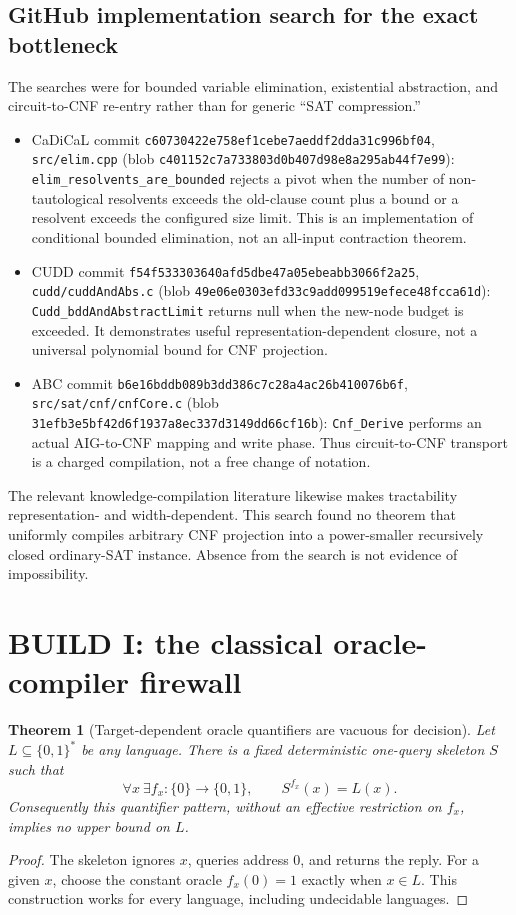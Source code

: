 \documentclass[11pt]{article}
\newtheorem{theorem}{Theorem}
\begin{document}
\subsection{GitHub implementation search for the exact bottleneck}
The searches were for bounded variable elimination, existential abstraction,
and circuit-to-CNF re-entry rather than for generic ``SAT compression.''
\begin{itemize}
\item CaDiCaL commit
\texttt{c60730422e758ef1cebe7aeddf2dda31c996bf04},
\texttt{src/elim.cpp} (blob
\texttt{c401152c7a733803d0b407d98e8a295ab44f7e99}):
\texttt{elim\_resolvents\_are\_bounded} rejects a pivot when the number of
non-tautological resolvents exceeds the old-clause count plus a bound or a
resolvent exceeds the configured size limit.  This is an implementation of
conditional bounded elimination, not an all-input contraction theorem.
\item CUDD commit
\texttt{f54f533303640afd5dbe47a05ebeabb3066f2a25},
\texttt{cudd/cuddAndAbs.c} (blob
\texttt{49e06e0303efd33c9add099519efece48fcca61d}):
\texttt{Cudd\_bddAndAbstractLimit} returns null when the new-node budget is
exceeded.  It demonstrates useful representation-dependent closure, not a
universal polynomial bound for CNF projection.
\item ABC commit
\texttt{b6e16bddb089b3dd386c7c28a4ac26b410076b6f},
\texttt{src/sat/cnf/cnfCore.c} (blob
\texttt{31efb3e5bf42d6f1937a8ec337d3149dd66cf16b}):
\texttt{Cnf\_Derive} performs an actual AIG-to-CNF mapping and write phase.
Thus circuit-to-CNF transport is a charged compilation, not a free change of
notation.
\end{itemize}
The relevant knowledge-compilation literature likewise makes tractability
representation- and width-dependent.  This search found no theorem that
uniformly compiles arbitrary CNF projection into a power-smaller recursively
closed ordinary-SAT instance.  Absence from the search is not evidence of
impossibility.

\section{BUILD I: the classical oracle-compiler firewall}
\begin{theorem}[Target-dependent oracle quantifiers are vacuous for decision]
Let $L\subseteq\{0,1\}^*$ be any language.  There is a fixed deterministic
one-query skeleton $S$ such that
\[
 \forall x\ \exists f_x:\{0\}\to\{0,1\},\qquad S^{f_x}(x)=L(x).
\]
Consequently this quantifier pattern, without an effective restriction on
$f_x$, implies no upper bound on $L$.
\end{theorem}
\begin{proof}
The skeleton ignores $x$, queries address $0$, and returns the reply.  For a
given $x$, choose the constant oracle $f_x(0)=1$ exactly when $x\in L$.
This construction works for every language, including undecidable languages.
\end{proof}
\end{document}
